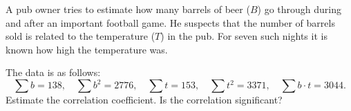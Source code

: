 A pub owner tries to estimate how many barrels of beer ($B$) go through during and after an important football game. 
He suspects that the number of barrels sold is related to the temperature ($T$) in the pub.
For seven such nights it is known how high the temperature was.

The data is as follows:
\[
 \sum b = 138, \quad  \sum b^2 = 2776, \quad \sum t = 153, \quad \sum t^2 = 3371, \quad \sum b \cdot t = 3044.
\]
Estimate the correlation coefficient.
Is the correlation significant?